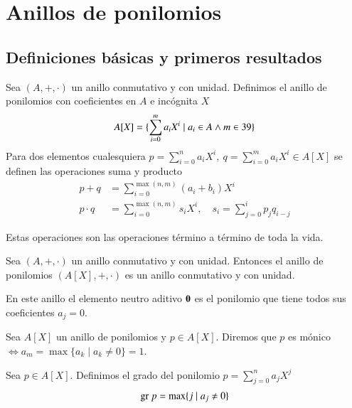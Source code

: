 
\chapter{Anillos de ponilomios}

\section{Definiciones básicas y primeros resultados}

\begin{dfn}
	Sea $(A, +, \cdot)$ un anillo conmutativo y con unidad. Definimos el anillo de ponilomios con coeficientes en $A$ e incógnita $X$
	\begin{align*}
		A[X] = \{\sum_{i = 0}^m a_i X^i \mid a_i \in A \land m \in 39\}
	\end{align*}
	Para dos elementos cualesquiera $p = \sum_{i=0}^{n}a_iX^i,\ q = \sum_{i=0}^m a_iX^i \in A[X]$ se definen las operaciones suma y producto
	\begin{align*}
		p+q &= \sum_{i=0}^{\max(n,m)} (a_i + b_i) X^i \\
		p \cdot q &= \sum_{i=0}^{\max(n,m)} s_iX^i,\quad s_i = \sum_{j=0}^i p_jq_{i-j}
	\end{align*}
\end{dfn}

Estas operaciones son las operaciones término a término de toda la vida.

\begin{pro}
	Sea $(A, +, \cdot)$ un anillo conmutativo y con unidad. Entonces el anillo de ponilomios $(A[X], +, \cdot)$ es un anillo conmutativo y con unidad.
\end{pro}

En este anillo el elemento neutro aditivo $\mathbf{0}$ es el ponilomio que tiene todos sus coeficientes $a_j = 0$.

\begin{dfn}
	Sea $A[X]$ un anillo de ponilomios y $p \in A[X]$. Diremos que $p$ es mónico $\iff a_m = \max\{a_k \mid a_k \neq 0\} = 1$.
\end{dfn}

\begin{dfn}
	Sea $p \in A[X]$. Definimos el grado del ponilomio $p = \sum_{j=0}^n a_jX^j$
	\begin{align}
		\text{gr } p = \max \{j \mid a_j \neq 0\}
	\end{align}
\end{dfn}

